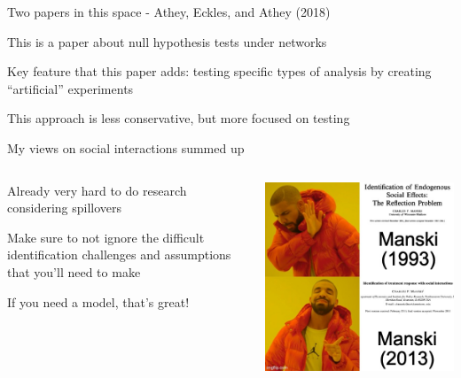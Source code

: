 \documentclass[notes,11pt, aspectratio=169]{beamer}
\newenvironment{wideitemize}{\itemize\addtolength{\itemsep}{10pt}}{\enditemize}
\begin{document}
\begin{frame}{Two papers in this space - Athey, Eckles, and Athey (2018)}
  \begin{wideitemize}
  \item This is a paper about null hypothesis tests under networks
  \item Key feature that this paper adds: testing specific types of analysis by creating ``artificial'' experiments
  \item This approach is less conservative, but more focused on testing
  \end{wideitemize}
\end{frame}


\begin{frame}{My views on social interactions summed up}
\begin{columns}[T] %
  \begin{column}{.5\textwidth}
    \begin{wideitemize}
    \item Already very hard to do research considering spillovers
    \item Make sure to not ignore the difficult identification
      challenges and assumptions that you'll need to make
    \item If you need a model, that's great!
    \end{wideitemize}
  \end{column}%
  \hfill%
  \begin{column}{.5\textwidth}
    \includegraphics[width=\linewidth]{images/manskidrake.jpg}
  \end{column}
\end{columns}
    
\end{frame}
\end{document}
